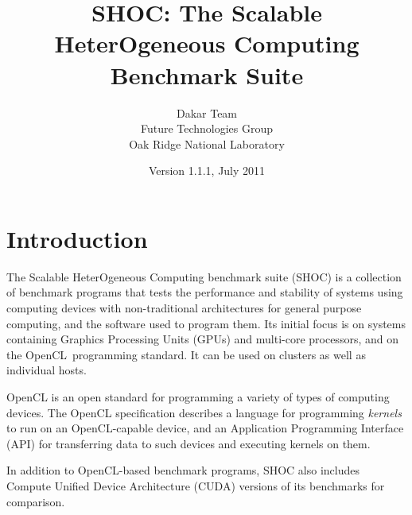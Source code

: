 \documentclass[11pt]{article}
\begin{document}
\title{SHOC: The Scalable HeterOgeneous Computing Benchmark Suite}
\author{Dakar Team\\Future Technologies Group\\Oak Ridge National Laboratory}
\date{Version 1.1.1, July 2011}
\maketitle

\section{Introduction}

The Scalable HeterOgeneous Computing benchmark suite (SHOC) is a collection of
benchmark programs that tests the performance and stability of systems using 
computing devices with non-traditional architectures for general purpose 
computing, and the software used to program them. Its initial focus is on 
systems containing Graphics Processing Units (GPUs) and multi-core 
processors, and on the OpenCL\,\cite{openclspec} programming standard.
It can be used on clusters as well as individual hosts.

OpenCL is an open standard for programming a variety of types of computing 
devices. The OpenCL specification describes a language for programming 
\emph{kernels} to run on an OpenCL-capable device, and an 
Application Programming Interface (API) for transferring data to such 
devices and executing kernels on them. 


In addition to OpenCL-based benchmark programs, SHOC also includes
Compute Unified Device Architecture (CUDA)\cite{cuda} versions
of its benchmarks for comparison.


\end{document}

